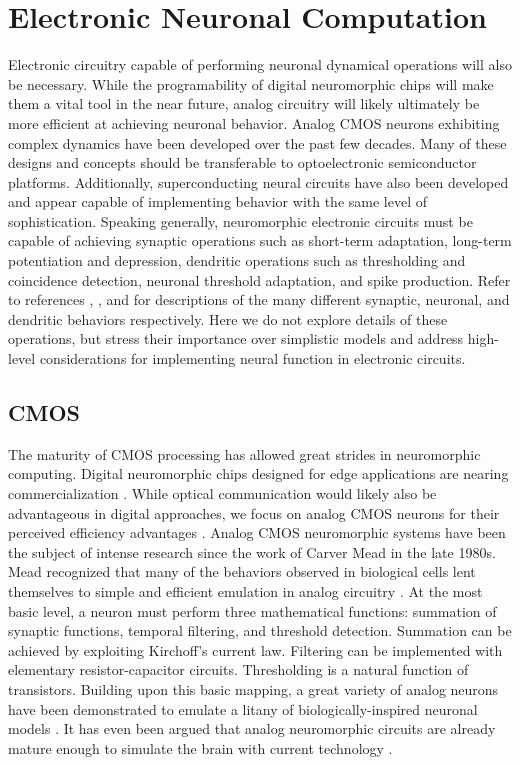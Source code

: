\documentclass[twocolumn]{article}
\begin{document}
\section{\label{sec:soma}Electronic Neuronal Computation}
Electronic circuitry capable of performing neuronal dynamical operations will also be necessary. While the programability of digital neuromorphic chips will make them a vital tool in the near future, analog circuitry will likely ultimately be more efficient at achieving neuronal behavior. Analog CMOS neurons exhibiting complex dynamics have been developed over the past few decades. Many of these designs and concepts should be transferable to optoelectronic semiconductor platforms. Additionally, superconducting neural circuits have also been developed and appear capable of implementing behavior with the same level of sophistication. Speaking generally, neuromorphic electronic circuits must be capable of achieving synaptic operations such as short-term adaptation, long-term potentiation and depression, dendritic operations such as thresholding and coincidence detection, neuronal threshold adaptation, and spike production. Refer to references \cite{citri2008synaptic}, \cite{miller2019combined, zenke2013synaptic}, and \cite{payeur2019classes} for descriptions of the many different synaptic, neuronal, and dendritic behaviors respectively. Here we do not explore details of these operations, but stress their importance over simplistic models and address high-level considerations for implementing neural function in electronic circuits. 

\subsection{CMOS}
The maturity of CMOS processing has allowed great strides in neuromorphic computing. Digital neuromorphic chips designed for edge applications are nearing commercialization \cite{davies2018loihi, merolla2014million}. While optical communication would likely also be advantageous in digital approaches, we focus on analog CMOS neurons for their perceived efficiency advantages \cite{rajendran2012specifications, mead1990neuromorphic}. Analog CMOS neuromorphic systems have been the subject of intense research since the work of Carver Mead in the late 1980s. Mead recognized that many of the behaviors observed in biological cells lent themselves to simple and efficient emulation in analog circuitry \cite{mead1990neuromorphic}. At the most basic level, a neuron must perform three mathematical functions: summation of synaptic functions, temporal filtering, and threshold detection. Summation can be achieved by exploiting Kirchoff's current law. Filtering can be implemented with elementary resistor-capacitor circuits. Thresholding is a natural function of transistors. Building upon this basic mapping, a great variety of analog neurons have been demonstrated to emulate a litany of biologically-inspired neuronal models \cite{indiveri2011neuromorphic,more,more}. It has even been argued that analog neuromorphic circuits are already mature enough to simulate the brain with current technology \cite{hasler2017special}.
\end{document}
